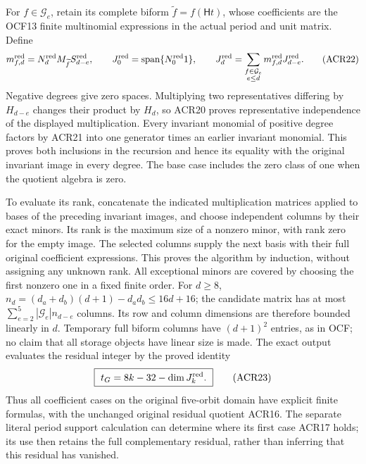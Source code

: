 \documentclass[11pt,a4paper]{article}
\begin{document}
For $f\in\mathcal G_e$, retain its complete biform
$\widetilde f=f(\mathsf Ht)$, whose coefficients are the
OCF13 finite multinomial expressions in the actual period
and unit matrix. Define
\[
 m_{f,d}^{\rm red}=N_d^{\rm red}M_{\widetilde f}S_{d-e}^{\rm red},
 \qquad
 J_0^{\rm red}=\operatorname{span}\{N_0^{\rm red}1\},\qquad
 J_d^{\rm red}=\sum_{\substack{f\in\mathcal G_e\\e\leq d}}
                     m_{f,d}^{\rm red}J_{d-e}^{\rm red}.
 \tag{ACR22}
\]
Negative degrees give zero spaces. Multiplying two
representatives differing by $H_{d-e}$ changes their
product by $H_d$, so ACR20 proves representative independence
of the displayed multiplication. Every invariant monomial
of positive degree factors by ACR21 into one generator
times an earlier invariant monomial. This proves both
inclusions in the recursion and hence its equality with
the original invariant image in every degree. The base
case includes the zero class of one when the quotient
algebra is zero.

To evaluate its rank, concatenate the indicated multiplication
matrices applied to bases of the preceding invariant images,
and choose independent columns by their exact minors. Its
rank is the maximum size of a nonzero minor, with rank zero
for the empty image. The selected columns supply the next
basis with their full original coefficient expressions.
This proves the algorithm by induction, without assigning
any unknown rank. All exceptional minors are covered by
choosing the first nonzero one in a fixed finite order.
For $d\geq8$, $n_d=(d_a+d_b)(d+1)-d_ad_b\leq16d+16$;
the candidate matrix has at most
$\sum_{e=2}^5|\mathcal G_e|n_{d-e}$ columns. Its row and
column dimensions are therefore bounded linearly in $d$.
Temporary full biform columns have $(d+1)^2$ entries, as
in OCF; no claim that all storage objects have linear
size is made. The exact output evaluates the residual
integer by the proved identity
\[
             \boxed{\ t_G=8k-32-\dim J_k^{\rm red}.\ }
 \tag{ACR23}
\]
Thus all coefficient cases on the original five-orbit
domain have explicit finite formulas, with the unchanged
original residual quotient ACR16. The separate literal
period support calculation can determine where its
first case ACR17 holds; its use then retains the full
complementary residual, rather than inferring that this
residual has vanished.


\clearpage
\end{document}

